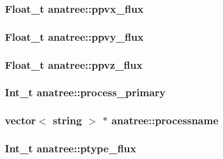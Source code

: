 \hypertarget{classanatree_a0d1e56f4b47964ea40672516ba877671}{
\subsubsection[{ppvx\-\_\-flux}]{\setlength{\rightskip}{0pt plus 5cm}Float\-\_\-t anatree\-::ppvx\-\_\-flux}}\label{classanatree_a0d1e56f4b47964ea40672516ba877671}
\hypertarget{classanatree_a3f12da41c30cfa5b0d5b2cd7a49f6879}{
\subsubsection[{ppvy\-\_\-flux}]{\setlength{\rightskip}{0pt plus 5cm}Float\-\_\-t anatree\-::ppvy\-\_\-flux}}\label{classanatree_a3f12da41c30cfa5b0d5b2cd7a49f6879}
\hypertarget{classanatree_a79454ca2f63ac3ca7d5cf0861e88bf5c}{
\subsubsection[{ppvz\-\_\-flux}]{\setlength{\rightskip}{0pt plus 5cm}Float\-\_\-t anatree\-::ppvz\-\_\-flux}}\label{classanatree_a79454ca2f63ac3ca7d5cf0861e88bf5c}
\hypertarget{classanatree_a104d39060f7947f9e5c2ee46e33ef686}{
\subsubsection[{process\-\_\-primary}]{\setlength{\rightskip}{0pt plus 5cm}Int\-\_\-t anatree\-::process\-\_\-primary}}\label{classanatree_a104d39060f7947f9e5c2ee46e33ef686}
\hypertarget{classanatree_a5f73011fc98884bb1cfe96f9dcc863e7}{
\subsubsection[{processname}]{\setlength{\rightskip}{0pt plus 5cm}vector$<$ string $>$ $\ast$ anatree\-::processname}}\label{classanatree_a5f73011fc98884bb1cfe96f9dcc863e7}
\hypertarget{classanatree_a390d9cff04f0d42915a66d77eedd8ef9}{
\subsubsection[{ptype\-\_\-flux}]{\setlength{\rightskip}{0pt plus 5cm}Int\-\_\-t anatree\-::ptype\-\_\-flux}}\label{classanatree_a390d9cff04f0d42915a66d77eedd8ef9}
